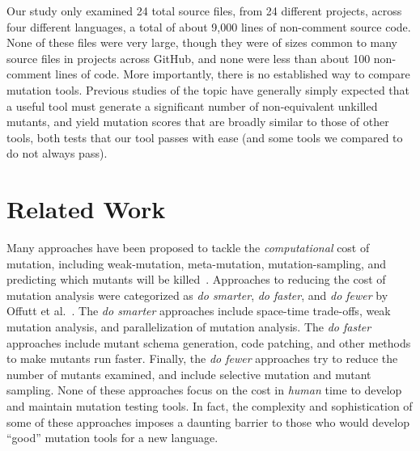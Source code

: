 \documentclass[acmsmall]{acmart}
\begin{document}
{Our study only examined 24 total source files, from 24 different projects, across four different
languages, a total of about 9,000 lines of non-comment source code.  None of these files were very large, though they were of
sizes common to many source files in projects across GitHub, and none
were less than about 100 non-comment lines of code.  More importantly,
there is no established way to compare mutation tools.
Previous studies of the topic have generally simply expected that a
useful tool must
generate a significant number of non-equivalent unkilled mutants, and
yield mutation scores that are broadly similar to those of other
tools, both tests that our tool passes with ease (and some tools we
compared to do not always pass).

\section{Related Work}

Many approaches have been proposed to tackle the \emph{computational} cost of mutation, including weak-mutation, 
meta-mutation, mutation-sampling, and predicting which mutants will be
killed~\cite{offuttMutant1996,
  untch1993mutation,KaufmanFAKAJ2022,zhang2016pmt}.  Approaches to reducing the cost of
mutation analysis were categorized as \textit{do smarter}, \textit{do
faster}, and \textit{do fewer} by Offutt et al.~\cite{offutt2001mutation}.
The \textit{do smarter} approaches include space-time trade-offs, weak
mutation analysis, and parallelization of mutation analysis. The \textit{do
faster} approaches include mutant schema generation, code patching, and
other methods to make mutants run faster. Finally, the
\textit{do fewer} approaches try to reduce the number of mutants examined,
and include selective mutation and mutant sampling.
None of these approaches focus on the cost in \emph{human} time to
develop and maintain mutation testing tools.  In fact, the complexity
and sophistication of some of these approaches imposes a daunting
barrier to those who would develop ``good'' mutation tools for a new
language.

}
\end{document}
